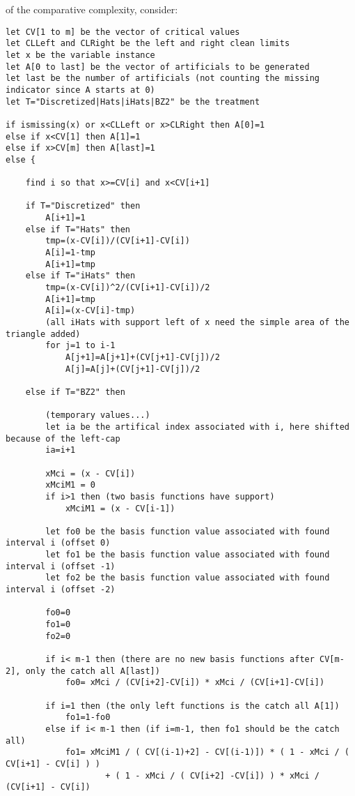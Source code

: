 \documentclass[10pt]{article}
\begin{document}
of the comparative complexity, consider:
\begin{Verbatim}[fontsize=\small,baselinestretch=0.75,formatcom=\color{red}]
let CV[1 to m] be the vector of critical values
let CLLeft and CLRight be the left and right clean limits
let x be the variable instance
let A[0 to last] be the vector of artificials to be generated
let last be the number of artificials (not counting the missing indicator since A starts at 0)
let T="Discretized|Hats|iHats|BZ2" be the treatment

if ismissing(x) or x<CLLeft or x>CLRight then A[0]=1
else if x<CV[1] then A[1]=1
else if x>CV[m] then A[last]=1
else {

    find i so that x>=CV[i] and x<CV[i+1]

    if T="Discretized" then
        A[i+1]=1
    else if T="Hats" then
        tmp=(x-CV[i])/(CV[i+1]-CV[i])
        A[i]=1-tmp
        A[i+1]=tmp
    else if T="iHats" then
        tmp=(x-CV[i])^2/(CV[i+1]-CV[i])/2
        A[i+1]=tmp
        A[i]=(x-CV[i]-tmp)
        (all iHats with support left of x need the simple area of the triangle added)
        for j=1 to i-1
            A[j+1]=A[j+1]+(CV[j+1]-CV[j])/2
            A[j]=A[j]+(CV[j+1]-CV[j])/2

    else if T="BZ2" then

        (temporary values...)
        let ia be the artifical index associated with i, here shifted because of the left-cap
        ia=i+1

        xMci = (x - CV[i])
        xMciM1 = 0
        if i>1 then (two basis functions have support)
            xMciM1 = (x - CV[i-1])

        let fo0 be the basis function value associated with found interval i (offset 0)
        let fo1 be the basis function value associated with found interval i (offset -1)
        let fo2 be the basis function value associated with found interval i (offset -2)

        fo0=0
        fo1=0
        fo2=0

        if i< m-1 then (there are no new basis functions after CV[m-2], only the catch all A[last])
            fo0= xMci / (CV[i+2]-CV[i]) * xMci / (CV[i+1]-CV[i])

        if i=1 then (the only left functions is the catch all A[1])
            fo1=1-fo0
        else if i< m-1 then (if i=m-1, then fo1 should be the catch all)
            fo1= xMciM1 / ( CV[(i-1)+2] - CV[(i-1)]) * ( 1 - xMci / ( CV[i+1] - CV[i] ) )
                    + ( 1 - xMci / ( CV[i+2] -CV[i]) ) * xMci / (CV[i+1] - CV[i])


\end{Verbatim}
\end{document}
